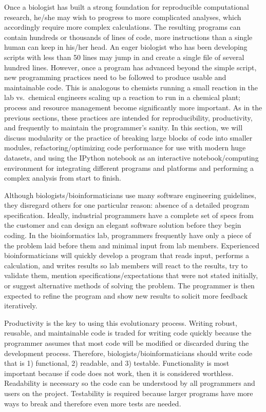 \documentclass[ChapterTOCs,krantz2]{krantz} %
\begin{document}
Once a biologist has built a strong foundation for reproducible computational
research, he/she may wish to progress to more complicated analyses, which
accordingly require more complex calculations.  The resulting programs can
contain hundreds or thousands of lines of code, more instructions than a single
human can keep in his/her head.  An eager biologist who has been developing 
scripts with less than 50 lines may jump in and create a single file of
several hundred lines.  However, once a program has advanced beyond the
simple script, new programming practices need to be followed to produce usable
and maintainable code.  This is analogous to chemists running a small reaction
in the lab vs.\ chemical engineers scaling up a reaction to run in a chemical
plant; process and resource management become significantly more important.  As in the
previous sections, these practices are intended for reproducibility,
productivity, and frequently to maintain the programmer's sanity.  In this
section, we will discuss modularity or the practice of breaking large blocks of
code into smaller modules, refactoring/optimizing code performance for use with
modern huge datasets, and using the IPython notebook as an interactive
notebook/computing environment for integrating different programs and platforms
and performing a complex analysis from start to finish.

Although biologists/bioinformaticians use many software engineering guidelines, 
they disregard others for one particular reason:
absence of a detailed program specification.  Ideally, industrial
programmers have a complete set of specs from the customer 
and can design an elegant software solution before they begin
coding.  In the bioinformatics lab, programmers frequently have only a piece of
the problem laid before them and minimal input from lab members.  
Experienced bioinformaticians will quickly
develop a program that reads input, performs a calculation, and writes
results so lab members will react to the results, try to validate them, mention
specifications/expectations that were not stated initially, or
suggest alternative methods of solving the problem.  The programmer is then
expected to refine the program and show new results to
solicit more feedback iteratively. 

Productivity is the key to using this evolutionary process.  
Writing robust, reusable, and maintainable code is traded for
writing code quickly because the programmer assumes that most code will be
modified or discarded during the development process.  Therefore,
biologists/bioinformaticians should write code that is 1) functional, 2)
readable, and 3) testable.  Functionality is most important because if code
does not work, then it is considered worthless.
Readability is necessary so the code can be understood by all programmers and users
on the project.  
Testability is required
because larger programs have more ways to break and therefore even more tests
are needed.
\end{document}

